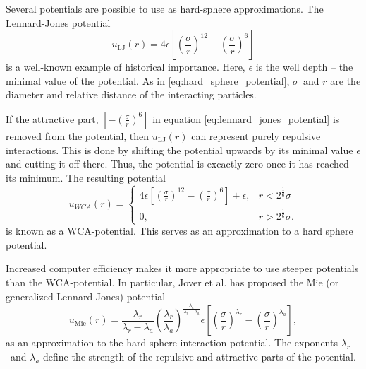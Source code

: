 Several potentials are possible to use as hard-sphere approximations.
The Lennard-Jones potential 
\begin{equation}
    \label{eq:lennard_jones_potential}
    u_{\text{LJ}}(r) = 
        4 \epsilon \left[
            \left(\frac{\sigma}{r}\right)^{12} -
            \left(\frac{\sigma}{r}\right)^{6}
        \right]
\end{equation}
is a well-known example of historical importance.
Here, $\epsilon$ is the well depth -- the minimal value of the potential.
As in \eqref{eq:hard_sphere_potential}, 
$\sigma$ and $r$ are the diameter and relative distance of the interacting particles.

If the attractive part, 
$\left[- \left(\frac{\sigma}{r}\right)^{6}\right]$
in equation \eqref{eq:lennard_jones_potential} is removed from the potential, 
then $u_{\text{LJ}}(r)$ 
can represent purely repulsive interactions.
This is done by shifting the potential
upwards by its minimal value $\epsilon$ and cutting it off there. 
Thus, the potential is excactly zero once it has reached its minimum.
The resulting potential
\begin{equation}
    \label{eq:WCA_potential}
    u_{WCA}(r) = 
    \begin{cases}
        4 \epsilon \left[
            \left(\frac{\sigma}{r}\right)^{12} -
            \left(\frac{\sigma}{r}\right)^{6}
        \right]
        + \epsilon,
            & r < 2^\frac{1}{6} \sigma\\
        0,  & r > 2^\frac{1}{6}\sigma.
    \end{cases}
\end{equation}
is known as a WCA-potential.
This serves as an approximation to a hard sphere potential.

Increased computer efficiency makes it more appropriate to use 
steeper potentials than the WCA-potential.
In particular, Jover et al. \cite{ref:jover:pseudo_hard} 
has proposed the Mie (or generalized Lennard-Jones) potential
\begin{equation}
    u_{\text{Mie}}(r) = 
        \frac{\lambda_r}{\lambda_r - \lambda_a}
        \left(\frac{\lambda_r}{\lambda_a}\right)
        ^{\frac{\lambda_a}{\lambda_r - \lambda_a}}
        \epsilon \left[
            \left(\frac{\sigma}{r}\right)^{\lambda_r} -
            \left(\frac{\sigma}{r}\right)^{\lambda_a}
        \right],
\end{equation}
as an approximation to the hard-sphere interaction potential.
The exponents $\lambda_r$ and $\lambda_a$ define the strength of the 
repulsive and attractive parts of the potential.

